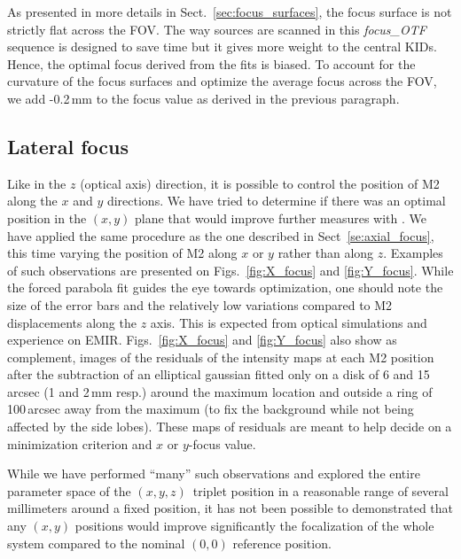 As presented in more details in Sect.~\ref{sec:focus_surfaces}, the focus
surface is not strictly flat across the FOV. The way sources are scanned in
this \emph{focus\_OTF} sequence is designed to save time but it gives more weight
to the central KIDs. Hence, the optimal focus derived from the fits is
biased. To account for the curvature of the focus surfaces and optimize the
average focus across the FOV, we add -0.2\,mm to the focus value as derived
in the previous paragraph. 

\subsection{Lateral focus}
\label{sec:focus_X_Y}

Like in the $z$ (optical axis) direction, it is possible to control the position
of M2 along the $x$ and $y$ directions. We have tried to determine if there was
an optimal position in the $(x,y)$ plane that would improve further measures
with \nika. We have applied the same procedure as the one described in
Sect~\ref{se:axial_focus}, this time varying the position of M2 along $x$ or $y$
rather than along $z$. Examples of such observations are presented on
Figs.~\ref{fig:X_focus} and \ref{fig:Y_focus}. While the forced parabola fit
guides the eye towards optimization, one should note the size of the error bars
and the relatively low variations compared to M2 displacements along the $z$
axis. This is expected from optical simulations and experience on
EMIR. Figs.~\ref{fig:X_focus} and \ref{fig:Y_focus} also show as complement,
images of the residuals of the intensity maps at each M2 position after the
subtraction of an elliptical gaussian fitted only on a disk of 6 and 15\,arcsec
(1 and 2\,mm resp.) around the maximum location and outside a ring of 100\,arcsec
away from the maximum (to fix the background while not being affected by the
side lobes). These maps of residuals are meant to help decide on a minimization
criterion and $x$ or $y$-focus value.

While we have performed ``many'' such observations and explored the entire
parameter space of the $(x,y,z)$~triplet position in a reasonable range of
several millimeters around a fixed position, it has not been possible to
demonstrated that any $(x,y)$ positions would improve significantly the
focalization of the whole system compared to the nominal $(0,0)$ reference
position.  

